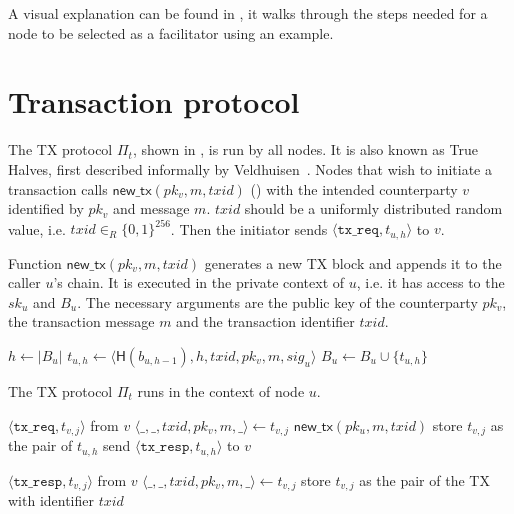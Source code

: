 A visual explanation can be found in ,
it walks through the steps needed for a node to be selected as a facilitator using an example.

\section{Transaction protocol}
\label{sec:tx-protocol}

The TX protocol $\Pi_t$, shown in , is run by all nodes.
It is also known as True Halves, first described informally by Veldhuisen~\cite[Chapter~3.2]{truehalves}.
Nodes that wish to initiate a transaction calls $\textsf{new\_tx}(pk_v, m, txid)$ () with the intended counterparty $v$ identified by $pk_v$ and message $m$.
$txid$ should be a uniformly distributed random value, i.e. $txid \in_R \{0, 1\}^{256}$.
Then the initiator sends $\langle \texttt{tx\_req}, t_{u, h}\rangle$ to $v$.

\begin{algorithm}
    \caption{Function $\textsf{new\_tx}(pk_v, m, txid)$ generates a new TX block and appends it to the caller $u$'s chain.
    It is executed in the private context of $u$, i.e. it has access to the $sk_u$ and $B_u$.
    The necessary arguments are the public key of the counterparty $pk_v$, the transaction message $m$ and the transaction identifier $txid$.}
    \label{alg:new-tx}

    \begin{algorithmic}
    \State $h \gets |B_u|$
    \State $t_{u, h} \gets \langle \textsf{H}(b_{u, h - 1}), h, txid, pk_v, m, sig_u \rangle$
    \State $B_u \gets B_u \cup \{ t_{u, h} \}$
    \end{algorithmic}
\end{algorithm}

\begin{algorithm}
    \caption{The TX protocol $\Pi_t$ runs in the context of node $u$.}
    \label{alg:tx-proto}

    \begin{algorithmic}
        \Upon $\langle \texttt{tx\_req}, t_{v, j} \rangle$ from $v$
        \State $\langle \_, \_, txid, pk_v, m, \_ \rangle \gets t_{v, j}$
        \State $\textsf{new\_tx}(pk_u, m, txid)$
        \State store $t_{v, j}$ as the pair of $t_{u, h}$
        \State send $\langle \texttt{tx\_resp}, t_{u, h} \rangle$ to $v$

        \Upon $\langle \texttt{tx\_resp}, t_{v, j} \rangle$ from $v$
        \State $\langle \_, \_, txid, pk_v, m, \_ \rangle \gets t_{v, j}$
        \State store $t_{v, j}$ as the pair of the TX with identifier $txid$
    \end{algorithmic}
\end{algorithm}

